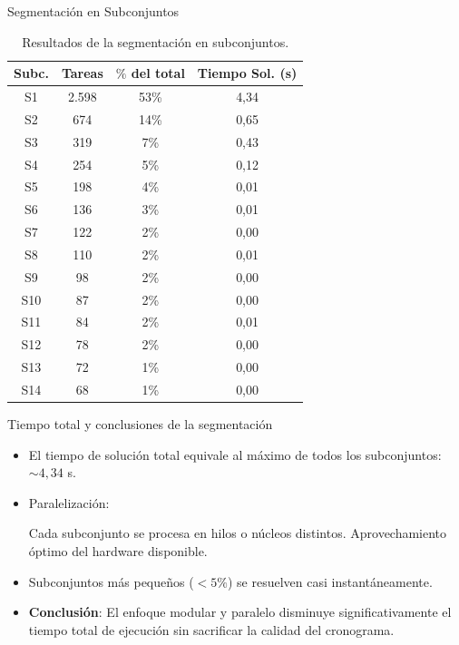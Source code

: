 \documentclass[pdfpagelabels=false, usepdftitle=false, aspectratio=169]{beamer}
\begin{document}
\begin{frame}{Segmentación en Subconjuntos}
\begin{table}[htbp]
    \centering
    \footnotesize
    \begin{tabular}{cccc}
        \toprule
        \textbf{Subc.} & \textbf{Tareas} & \(\%\) \textbf{del total} & \textbf{Tiempo Sol. (s)} \\
        \midrule
        S1 & 2.598 & 53\% & 4,34 \\
        S2 & 674   & 14\% & 0,65 \\
        S3 & 319   & 7\%  & 0,43 \\
        S4 & 254   & 5\%  & 0,12 \\
        S5 & 198   & 4\%  & 0,01 \\
        S6 & 136   & 3\%  & 0,01 \\
        S7 & 122   & 2\%  & 0,00 \\
        S8 & 110   & 2\%  & 0,01 \\
        S9 & 98    & 2\%  & 0,00 \\
        S10 & 87   & 2\%  & 0,00 \\
        S11 & 84   & 2\%  & 0,01 \\
        S12 & 78   & 2\%  & 0,00 \\
        S13 & 72   & 1\%  & 0,00 \\
        S14 & 68   & 1\%  & 0,00 \\
        \bottomrule
    \end{tabular}
    \caption{Resultados de la segmentación en subconjuntos.}
    \label{tab:subsets_results}
\end{table}
\vfill
\end{frame}


\begin{frame}{Tiempo total y conclusiones de la segmentación}
\begin{itemize}
    \item El tiempo de solución total equivale al máximo de todos los subconjuntos: \(\sim 4,34\) s.
    \vfill
    \item Paralelización:
    \begin{itemize}
        \arrowitem Cada subconjunto se procesa en hilos o núcleos distintos.
        \arrowitem Aprovechamiento óptimo del hardware disponible.
    \end{itemize}
    \vfill
    \item Subconjuntos más pequeños (\(<5\%\)) se resuelven casi instantáneamente.
    \vfill
    \item \textbf{Conclusión}: El enfoque modular y paralelo disminuye significativamente el tiempo total de ejecución sin sacrificar la calidad del cronograma.
\end{itemize}
\vfill
\end{frame}
\end{document}
